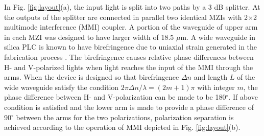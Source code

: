 \documentclass[letterpaper, 10pt]{article}
\begin{document}
In Fig. \ref{fig:layout}(a), the input light is split into two paths by a 3 dB splitter.
At the outputs of the splitter are connected in parallel two identical MZIs with 2$\times$2 multimode interference (MMI) coupler.
A portion of the waveguide of upper arm in each MZI was designed to have larger width of 18.5 $\mu$m.
A wide waveguide in silica PLC is known to have birefringence  due to uniaxial strain generated in the fabrication process \cite{Okuno:1994fm}.
The birefringence causes relative phase differences between H- and V-polarized lights when light reaches the  input of the MMI through the arms.
When the device is designed so that birefringence $\Delta n$ and length $L$ of the wide waveguide satisfy the condition $2\pi\Delta n/\lambda  = (2m+1) \pi$ with integer $m$, the phase difference between H- and V-polarization can be made to be 180$^\circ$.
If above condition is satisfied and the lower arm is made to provide a phase difference of 90$^\circ$ between the arms for the two polarizations, polarization separation is achieved according to the operation of MMI depicted in Fig. \ref{fig:layout}(b).
\end{document}
